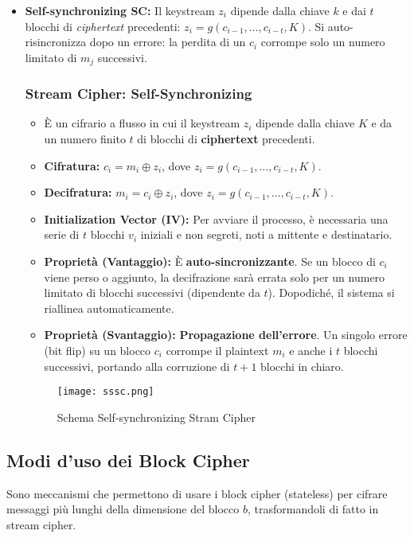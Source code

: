 \documentclass[../main.tex]{subfiles}
\begin{document}
\begin{itemize}
	\item \textbf{Self-synchronizing SC:} Il keystream $z_i$ dipende dalla chiave $k$ e dai $t$ blocchi di \emph{ciphertext} precedenti: $z_i = g(c_{i-1}, ..., c_{i-t}, K)$. Si auto-risincronizza dopo un errore: la perdita di un $c_i$ corrompe solo un numero limitato di $m_j$ successivi. 
	            
	      \subsubsection{Stream Cipher: Self-Synchronizing}
	      \begin{itemize}
	      	\item È un cifrario a flusso in cui il keystream $z_i$ dipende dalla chiave $K$ e da un numero finito $t$ di blocchi di \textbf{ciphertext} precedenti.
	      	\item \textbf{Cifratura:} $c_i = m_i \oplus z_i$, dove $z_i = g(c_{i-1}, \dots, c_{i-t}, K)$.
	      	\item \textbf{Decifratura:} $m_i = c_i \oplus z_i$, dove $z_i = g(c_{i-1}, \dots, c_{i-t}, K)$.
	      	\item \textbf{Initialization Vector (IV):} Per avviare il processo, è necessaria una serie di $t$ blocchi $v_i$ iniziali e non segreti, noti a mittente e destinatario.
	      	\item \textbf{Proprietà (Vantaggio):} È \textbf{auto-sincronizzante}. Se un blocco di $c_i$ viene perso o aggiunto, la decifrazione sarà errata solo per un numero limitato di blocchi successivi (dipendente da $t$). Dopodiché, il sistema si riallinea automaticamente.
	      	\item \textbf{Proprietà (Svantaggio):} \textbf{Propagazione dell'errore}. Un singolo errore (bit flip) su un blocco $c_i$ corrompe il plaintext $m_i$ e anche i $t$ blocchi successivi, portando alla corruzione di $t+1$ blocchi in chiaro.
	      \end{itemize}

	      \begin{figure}[H]
	      	\centering
	      	\texttt{[image: sssc.png]}
	      	\caption{Schema Self-synchronizing Stram Cipher}
	      	\label{fig:etichetta}
	      \end{figure}
\end{itemize}

\subsection{Modi d'uso dei Block Cipher}
Sono meccanismi che permettono di usare i block cipher (stateless) per cifrare messaggi più lunghi della dimensione del blocco $b$, trasformandoli di fatto in stream cipher.
\end{document}
